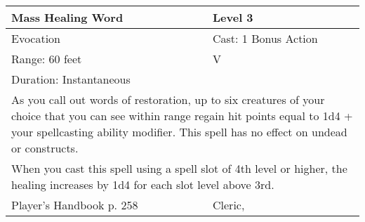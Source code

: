 \documentclass[11pt]{report}
\begin{document}
\begin{table}[H]
	\begin{tabular}{||p{6cm}|p{6cm}||}
		\hline\hline
		\bf{Mass Healing Word} & Level 3\\ \hline
		Evocation & Cast: 1 Bonus Action\\ \hline
		Range: 60 feet & V\\ \hline
		Duration: Instantaneous & \\ \hline
		\multicolumn{2}{||p{12cm}||}{As you call out words of restoration, up to six creatures of your choice that you can see within range regain hit points equal to 1d4 + your spellcasting ability modifier. This spell has no effect on undead or constructs.}\\ \hline
		\multicolumn{2}{||p{12cm}||}{When you cast this spell using a spell slot of 4th level or higher, the healing increases by 1d4 for each slot level above 3rd.}\\ \hline
Player's Handbook p. 258 & Cleric, \\ \hline\hline
	\end{tabular}
\end{table}
\end{document}
